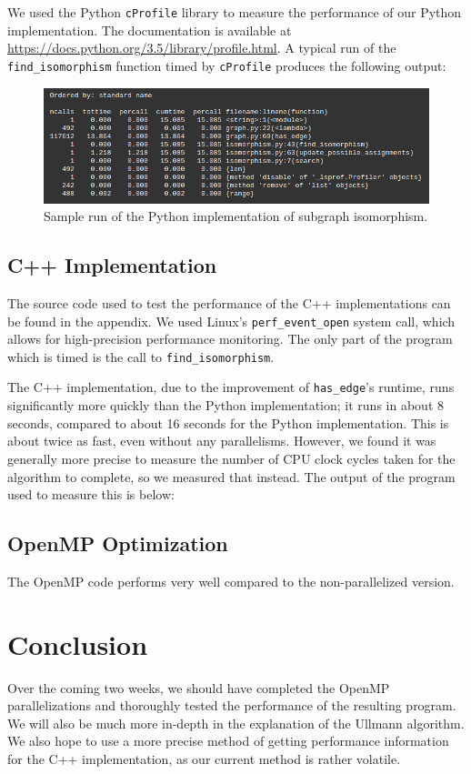 \documentclass{article}
\begin{document}
  We used the Python \texttt{cProfile} library to measure the performance of our Python implementation. The documentation is available at \url{https://docs.python.org/3.5/library/profile.html}. A typical run of the \texttt{find\_isomorphism} function timed by \texttt{cProfile} produces the following output:

  \begin{figure}[H]
    \centering
    \includegraphics[scale=0.6]{images/perf}
    \caption{Sample run of the Python implementation of subgraph isomorphism.}
  \end{figure}

  \subsection{C++ Implementation}
  The source code used to test the performance of the C++ implementations can be found in the appendix. We used Linux's \texttt{perf\_event\_open} system call, which allows for high-precision performance monitoring. The only part of the program which is timed is the call to \texttt{find\_isomorphism}. 

  The C++ implementation, due to the improvement of \texttt{has\_edge}'s runtime, runs significantly more quickly than the Python implementation; it runs in about 8 seconds, compared to about 16 seconds for the Python implementation. This is about twice as fast, even without any parallelisms. However, we found it was generally more precise to measure the number of CPU clock cycles taken for the algorithm to complete, so we measured that instead. The output of the program used to measure this is below:

  \subsection{OpenMP Optimization}
  The OpenMP code performs very well compared to the non-parallelized version.

\section{Conclusion}
  Over the coming two weeks, we should have completed the OpenMP parallelizations and thoroughly tested the performance of the resulting program. We will also be much more in-depth in the explanation of the Ullmann algorithm. We also hope to use a more precise method of getting performance information for the C++ implementation, as our current method is rather volatile.
\end{document}

